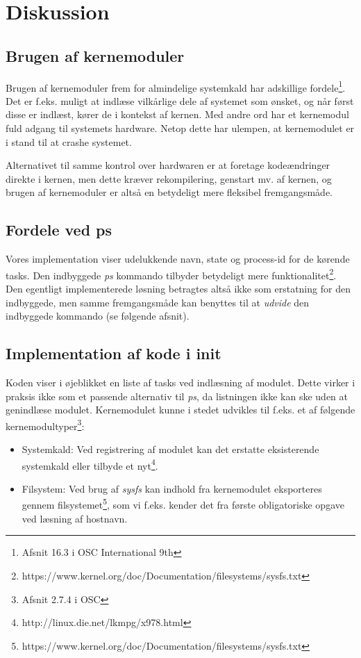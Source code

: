 \chapter{Diskussion}
\section{Brugen af kernemoduler}
Brugen af kernemoduler frem for almindelige systemkald har adskillige fordele\footnote{Afsnit 16.3 i OSC International 9th}. Det er f.eks. muligt at indlæse vilkårlige dele af systemet som ønsket, og når først disse er indlæst, kører de i kontekst af kernen. Med andre ord har et kernemodul fuld adgang til systemets hardware. Netop dette har ulempen, at kernemodulet er i stand til at crashe systemet.

Alternativet til samme kontrol over hardwaren er at foretage kodeændringer direkte i kernen, men dette kræver rekompilering, genstart mv. af kernen, og brugen af kernemoduler er altså en betydeligt mere fleksibel fremgangsmåde.

\section{Fordele ved ps}
Vores implementation viser udelukkende navn, state og process-id for de kørende tasks. Den indbyggede \textit{ps} kommando tilbyder betydeligt mere funktionalitet\footnote{https://www.kernel.org/doc/Documentation/filesystems/sysfs.txt}. Den egentligt implementerede løsning betragtes altså ikke som erstatning for den indbyggede, men samme fremgangsmåde kan benyttes til at \textit{udvide} den indbyggede kommando (se følgende afsnit).

\section{Implementation af kode i init}
Koden viser i øjeblikket en liste af tasks ved indlæsning af modulet. Dette virker i praksis ikke som et passende alternativ til \textit{ps}, da listningen ikke kan ske uden at genindlæse modulet. Kernemodulet kunne i stedet udvikles til f.eks. et af følgende kernemodultyper\footnote{Afsnit 2.7.4 i OSC}:
\begin{itemize}
\item Systemkald: Ved registrering af modulet kan det erstatte eksisterende systemkald eller tilbyde et nyt\footnote{http://linux.die.net/lkmpg/x978.html}.
\item Filsystem: Ved brug af \textit{sysfs} kan indhold fra kernemodulet eksporteres gennem filsystemet\footnote{https://www.kernel.org/doc/Documentation/filesystems/sysfs.txt}, som vi f.eks. kender det fra første obligatoriske opgave ved læsning af hostnavn.
\end{itemize}

